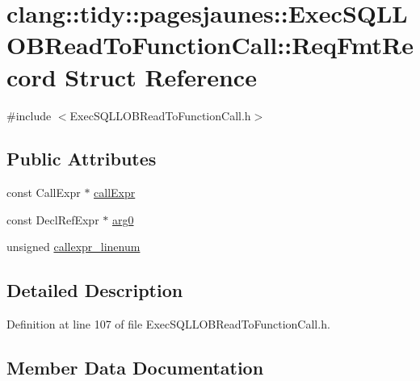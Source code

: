 \hypertarget{structclang_1_1tidy_1_1pagesjaunes_1_1_exec_s_q_l_l_o_b_read_to_function_call_1_1_req_fmt_record}{}\section{clang\+:\+:tidy\+:\+:pagesjaunes\+:\+:Exec\+S\+Q\+L\+L\+O\+B\+Read\+To\+Function\+Call\+:\+:Req\+Fmt\+Record Struct Reference}
\label{structclang_1_1tidy_1_1pagesjaunes_1_1_exec_s_q_l_l_o_b_read_to_function_call_1_1_req_fmt_record}


{\ttfamily \#include $<$Exec\+S\+Q\+L\+L\+O\+B\+Read\+To\+Function\+Call.\+h$>$}

\subsection*{Public Attributes}
\begin{DoxyCompactItemize}
\item 
const Call\+Expr $\ast$ \hyperlink{structclang_1_1tidy_1_1pagesjaunes_1_1_exec_s_q_l_l_o_b_read_to_function_call_1_1_req_fmt_record_a1892e75bee0bf61f4656975535597536}{call\+Expr}
\item 
const Decl\+Ref\+Expr $\ast$ \hyperlink{structclang_1_1tidy_1_1pagesjaunes_1_1_exec_s_q_l_l_o_b_read_to_function_call_1_1_req_fmt_record_a3fac5f19730ee207389173ec00245a09}{arg0}
\item 
unsigned \hyperlink{structclang_1_1tidy_1_1pagesjaunes_1_1_exec_s_q_l_l_o_b_read_to_function_call_1_1_req_fmt_record_a61b591191d2e5d100bcbb5e2a588bfcd}{callexpr\+\_\+linenum}
\end{DoxyCompactItemize}


\subsection{Detailed Description}


Definition at line 107 of file Exec\+S\+Q\+L\+L\+O\+B\+Read\+To\+Function\+Call.\+h.



\subsection{Member Data Documentation}
\mbox{\label{structclang_1_1tidy_1_1pagesjaunes_1_1_exec_s_q_l_l_o_b_read_to_function_call_1_1_req_fmt_record_a3fac5f19730ee207389173ec00245a09}} 

